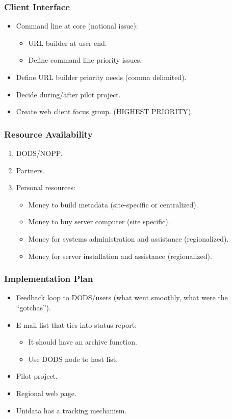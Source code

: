 \subsubsection{Client Interface}
\begin{itemize}
\item Command line at core (national issue):
\begin{itemize}
  \item URL builder at user end.
  \item Define command line priority issues.
\end{itemize}
\item Define URL builder priority needs (comma delimited).
\item Decide during/after pilot project.
\item Create web client focus group. (HIGHEST PRIORITY).
\end{itemize}

\subsubsection{Resource Availability}
\begin{enumerate}
\item DODS/NOPP.
\item Partners.
\item Personal resources:
\begin{itemize}
  \item Money to build metadata (site-specific or centralized).
  \item Money to buy server computer (site specific).
  \item Money for systems administration and assistance (regionalized).
  \item Money for server installation and assistance (regionalized).
\end{itemize}
\end{enumerate}

\subsubsection{Implementation Plan}
\begin{itemize}
\item Feedback loop to DODS/users (what went smoothly, what were the ``gotchas'').
\item E-mail list that ties into status report:
\begin{itemize}
  \item It should have an archive function.
  \item Use DODS node to host list.
\end{itemize}
\item Pilot project.
\item Regional web page.
\item Unidata has a tracking mechanism.
\end{itemize}

